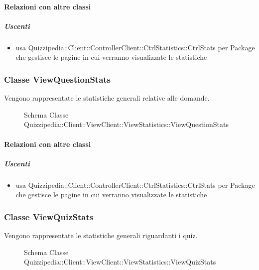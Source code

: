 \paragraph{Relazioni con altre classi}
\subparagraph{Uscenti}
\begin{itemize}
\item usa Quizzipedia::Client::ControllerClient::CtrlStatistics::CtrlStats per Package che gestisce le pagine in cui verranno visualizzate le statistiche
\end{itemize}
\subsubsection{Classe ViewQuestionStats}
Vengono rappresentate le statistiche generali relative alle domande.
\begin{figure}[H]
\centering
\noindent{}
\caption[Schema Classe ViewQuestionStats]{Schema Classe Quizzipedia::Client::ViewClient::ViewStatistics::ViewQuestionStats}
\end{figure}
\paragraph{Relazioni con altre classi}
\subparagraph{Uscenti}
\begin{itemize}
\item usa Quizzipedia::Client::ControllerClient::CtrlStatistics::CtrlStats per Package che gestisce le pagine in cui verranno visualizzate le statistiche
\end{itemize}
\subsubsection{Classe ViewQuizStats}
Vengono rappresentate le statistiche generali riguardanti i quiz.
\begin{figure}[H]
\centering
\noindent{}
\caption[Schema Classe ViewQuizStats]{Schema Classe Quizzipedia::Client::ViewClient::ViewStatistics::ViewQuizStats}
\end{figure}
